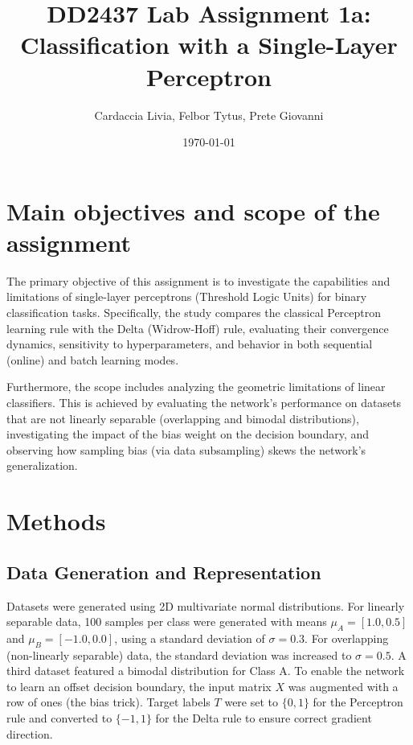 \documentclass[11pt,a4paper]{article}
\title{DD2437 Lab Assignment 1a: \\ Classification with a Single-Layer Perceptron}
\author{Cardaccia Livia, Felbor Tytus, Prete Giovanni}
\date{\today}
\begin{document}
\maketitle

\section{Main objectives and scope of the assignment}
The primary objective of this assignment is to investigate the capabilities and limitations of single-layer perceptrons (Threshold Logic Units) for binary classification tasks. Specifically, the study compares the classical Perceptron learning rule with the Delta (Widrow-Hoff) rule, evaluating their convergence dynamics, sensitivity to hyperparameters, and behavior in both sequential (online) and batch learning modes. 

Furthermore, the scope includes analyzing the geometric limitations of linear classifiers. This is achieved by evaluating the network's performance on datasets that are not linearly separable (overlapping and bimodal distributions), investigating the impact of the bias weight on the decision boundary, and observing how sampling bias (via data subsampling) skews the network's generalization.

\section{Methods}
\subsection{Data Generation and Representation}
Datasets were generated using 2D multivariate normal distributions. For linearly separable data, 100 samples per class were generated with means $\mu_A = [1.0, 0.5]$ and $\mu_B = [-1.0, 0.0]$, using a standard deviation of $\sigma = 0.3$. For overlapping (non-linearly separable) data, the standard deviation was increased to $\sigma = 0.5$. A third dataset featured a bimodal distribution for Class A. To enable the network to learn an offset decision boundary, the input matrix $X$ was augmented with a row of ones (the bias trick). Target labels $T$ were set to $\{0, 1\}$ for the Perceptron rule and converted to $\{-1, 1\}$ for the Delta rule to ensure correct gradient direction.
\end{document}

